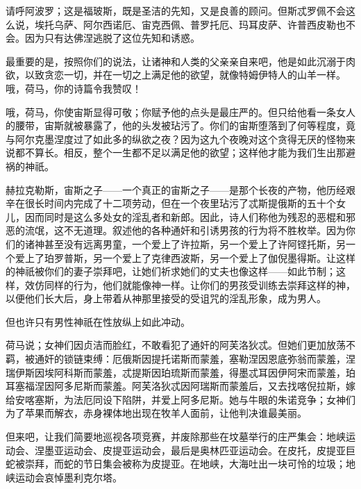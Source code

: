请呼阿波罗；这是福玻斯，既是圣洁的先知，又是良善的顾问。但斯忒罗佩不会这么说，埃托乌萨、阿尔西诺厄、宙克西佩、普罗托厄、玛耳皮萨、许普西皮勒也不会。因为只有达佛涅逃脱了这位先知和诱惑。\par

最重要的是，按照你们的说法，让诸神和人类的父亲亲自来吧，他是如此沉溺于肉欲，以致贪恋一切，并在一切之上满足他的欲望，就像特姆伊特人的山羊一样。哦，荷马，你的诗篇令我赞叹！\par

\par

哦，荷马，你使宙斯显得可敬；你赋予他的点头是最庄严的。但只给他看一条女人的腰带，宙斯就被暴露了，他的头发被玷污了。你们的宙斯堕落到了何等程度，竟与阿尔克墨涅度过了如此多的纵欲之夜？因为这九个夜晚对这个贪得无厌的怪物来说都不算长。相反，整个一生都不足以满足他的欲望；这样他才能为我们生出那避祸的神祇。\par

赫拉克勒斯，宙斯之子——一个真正的宙斯之子——是那个长夜的产物，他历经艰辛在很长时间内完成了十二项劳动，但在一个夜里玷污了忒斯提俄斯的五十个女儿，因而同时是这么多处女的淫乱者和新郎。因此，诗人们称他为残忍的恶棍和邪恶的流氓，这不无道理。叙述他的各种通奸和引诱男孩的行为将不胜枚举。因为你们的诸神甚至没有远离男童，一个爱上了许拉斯，另一个爱上了许阿铿托斯，另一个爱上了珀罗普斯，另一个爱上了克律西波斯，另一个爱上了伽倪墨得斯。让这样的神祇被你们的妻子崇拜吧，让她们祈求她们的丈夫也像这样——如此节制；这样，效仿同样的行为，他们就能像神一样。让你们的男孩受训练去崇拜这样的神，以便他们长大后，身上带着从神那里接受的受诅咒的淫乱形象，成为男人。\par

但也许只有男性神祇在性放纵上如此冲动。\par

荷马说；女神们因贞洁而脸红，不敢看犯了通奸的阿芙洛狄忒。但她们更加放荡不羁，被通奸的锁链束缚：厄俄斯因提托诺斯而蒙羞，塞勒涅因恩底弥翁而蒙羞，涅瑞伊斯因埃阿科斯而蒙羞，忒提斯因珀琉斯而蒙羞，得墨忒耳因伊阿宋而蒙羞，珀耳塞福涅因阿多尼斯而蒙羞。阿芙洛狄忒因阿瑞斯而蒙羞后，又去找喀倪拉斯，嫁给安喀塞斯，为法厄同设下陷阱，并爱上阿多尼斯。她与牛眼的朱诺竞争；女神们为了苹果而解衣，赤身裸体地出现在牧羊人面前，让他判决谁最美丽。\par

但来吧，让我们简要地巡视各项竞赛，并废除那些在坟墓举行的庄严集会：地峡运动会、涅墨亚运动会、皮提亚运动会，最后是奥林匹亚运动会。在皮托，皮提亚巨蛇被崇拜，而蛇的节日集会被称为皮提亚。在地峡，大海吐出一块可怜的垃圾；地峡运动会哀悼墨利克尔塔。\par

